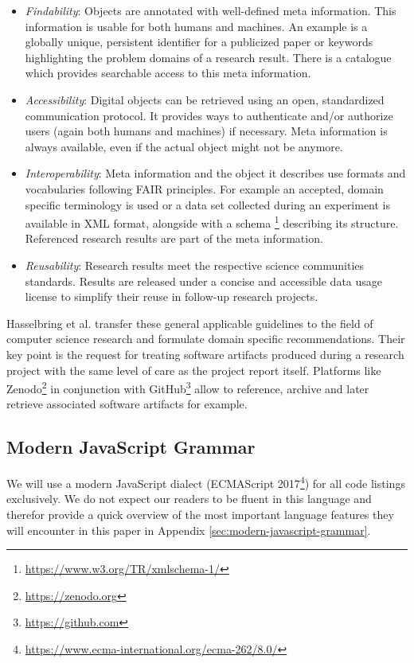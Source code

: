\documentclass[12pt,a4paper]{article}
\begin{document}
\begin{itemize}
	\item \emph{Findability}: Objects are annotated with well-defined meta information. This information is usable for both humans and machines. An example is a globally unique, persistent identifier for a publicized paper or keywords highlighting the problem domains of a research result. There is a catalogue which provides searchable access to this meta information.
	\item \emph{Accessibility}: Digital objects can be retrieved using an open, standardized communication protocol. It provides ways to authenticate and/or authorize users (again both humans and machines) if necessary. Meta information is always available, even if the actual object might not be anymore.
	\item \emph{Interoperability}: Meta information and the object it describes use formats and vocabularies following FAIR principles. For example an accepted, domain specific terminology is used or a data set collected during an experiment is available in XML format, alongside with a schema \footnote{\url{https://www.w3.org/TR/xmlschema-1/}} describing its structure. Referenced research results are part of the meta information.
	\item \emph{Reusability}: Research results meet the respective science communities standards. Results are released under a concise and accessible data usage license to simplify their reuse in follow-up research projects.
\end{itemize}

Hasselbring et al. \cite{2019arXiv190805986H} transfer these general applicable guidelines to the field of computer science research and formulate domain specific recommendations. Their key point is the request for treating software artifacts produced during a research project with the same level of care as the project report itself. Platforms like Zenodo\footnote{\url{https://zenodo.org}} in conjunction with GitHub\footnote{\url{https://github.com}} allow to reference, archive and later retrieve associated software artifacts for example.

\subsection{Modern JavaScript Grammar}
We will use a modern JavaScript dialect (ECMAScript 2017\footnote{\url{https://www.ecma-international.org/ecma-262/8.0/}}) for all code listings exclusively. We do not expect our readers to be fluent in this language and therefor provide a quick overview of the most important language features they will encounter in this paper in Appendix \ref{sec:modern-javascript-grammar}.
\end{document}
